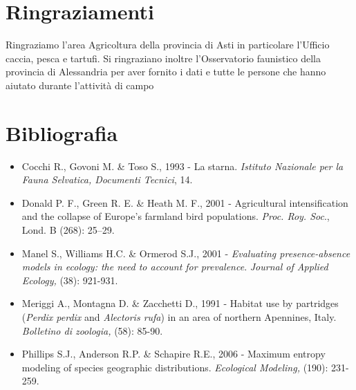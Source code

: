 \section*{Ringraziamenti}

Ringraziamo l{\textquoteright}area Agricoltura della provincia di Asti
in particolare l{\textquoteright}Ufficio caccia, pesca e tartufi. Si
ringraziano inoltre l{\textquoteright}Osservatorio faunistico della
provincia di Alessandria per aver fornito i dati e tutte le persone che
hanno aiutato durante l'attivit\`a di campo

\section*{Bibliografia}
\begin{itemize}
	\item Cocchi R., Govoni M. \& Toso S., 1993 - La starna. \textit{Istituto
Nazionale per la Fauna Selvatica, Documenti Tecnici}, 14.

	\item Donald P. F., Green R. E. \& Heath M. F., 2001 - Agricultural
intensification and the collapse of Europe{\textquoteright}s farmland
bird populations. \textit{Proc. Roy. Soc}., Lond. B (268): 25--29.

	\item Manel S., Williams H.C. \& Ormerod S.J., 2001 - \textit{Evaluating
presence-absence models in ecology: the need to account for
prevalence}. \textit{Journal of Applied Ecology,} (38): 921-931.

	\item Meriggi A., Montagna D. \& Zacchetti D., 1991 - Habitat use by
partridges (\textit{Perdix perdix} and \textit{Alectoris rufa}) in an
area of northern Apennines, Italy. \textit{Bolletino di zoologia,}
(58): 85-90.

	\item Phillips S.J., Anderson R.P. \& Schapire R.E., 2006 - Maximum entropy
modeling of species geographic distributions. \textit{Ecological
Modeling,} (190): 231-259.
\end{itemize}
